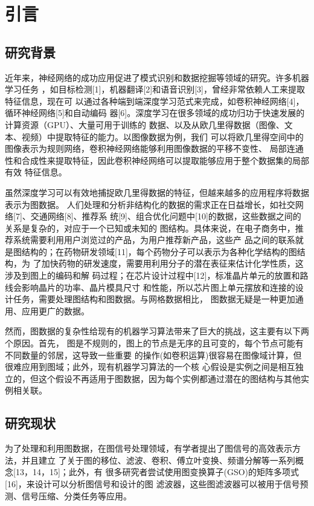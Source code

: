 \cleardoublepage

\section{引言}

\subsection{研究背景}
近年来，神经网络的成功应用促进了模式识别和数据挖掘等领域的研究。许多机器学习任务
，如目标检测[1]，机器翻译[2]和语音识别[3]，曾经非常依赖人工来提取特征信息，现在可
以通过各种端到端深度学习范式来完成，如卷积神经网络[4]，循环神经网络[5]和自动编码
器[6]。深度学习在很多领域的成功归功于快速发展的计算资源（GPU）、大量可用于训练的
数据、以及从欧几里得数据（图像、文本、视频）中提取特征的能力。以图像数据为例，我们
可以将欧几里得空间中的图像表示为规则网络，卷积神经网络能够利用图像数据的平移不变性、
局部连通性和合成性来提取特征，因此卷积神经网络可以提取能够应用于整个数据集的局部有效
特征信息。

虽然深度学习可以有效地捕捉欧几里得数据的特征，但越来越多的应用程序将数据表示为图数据。
人们处理和分析非结构化的数据的需求正在日益增长，如社交网络[7]、交通网络[8]、推荐系
统[9]、组合优化问题中[10]的数据，这些数据之间的关系是复杂的，对应于一个已知或未知的
图结构。具体来说，在电子商务中，推荐系统需要利用用户浏览过的产品，为用户推荐新产品，这些产
品之间的联系就是图结构的；在药物研发领域[11]，每个药物分子可以表示为各种化学结构的图结构，为
了加快药物的研发速度，需要用利用分子的潜在表征来估计化学性质，这涉及到图上的编码和解
码过程；在芯片设计过程中[12]，标准晶片单元的放置和路线会影响晶片的功率、晶片模具尺寸
和性能，所以芯片图上单元摆放和连接的设计任务，需要处理图结构和图数据。与网格数据相比，
图数据无疑是一种更加通用、应用更广的数据。

然而，图数据的复杂性给现有的机器学习算法带来了巨大的挑战，这主要有以下两个原因。首先，
图是不规则的，图上的节点是无序的且可变的，每个节点可能有不同数量的邻居，这导致一些重要
的操作(如卷积运算)很容易在图像域计算，但很难应用到图域；此外，现有机器学习算法的一个核
心假设是实例之间是相互独立的，但这个假设不再适用于图数据，因为每个实例都通过潜在的图结构与其他实例相关联。

\subsection{研究现状}
为了处理和利用图数据，在图信号处理领域，有学者提出了图信号的高效表示方法，并且建立
了关于图的移位、滤波、卷积、傅立叶变换、频谱分解等一系列概念[13，14，15]；此外，有
很多研究者尝试使用图变换算子(GSO)的矩阵多项式[16]，来设计可以分析图信号和设计的图
滤波器，这些图滤波器可以被用于信号预测、信号压缩、分类任务等应用。

